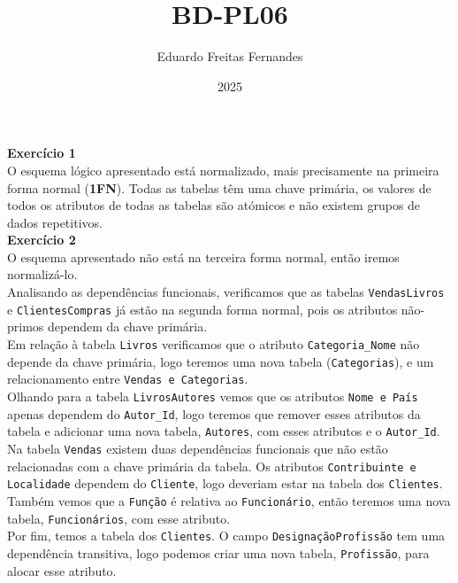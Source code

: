 \documentclass[a4paper,11pt]{article}
\title{BD-PL06}
\author{Eduardo Freitas Fernandes}
\date{2025}
\begin{document}
\maketitle

\noindent \textbf{Exercício 1}\\

\noindent O esquema lógico apresentado está normalizado, mais precisamente na primeira forma normal (\textbf{1FN}). Todas as tabelas têm uma chave primária, os valores de todos os atributos de todas as tabelas são atómicos e não existem grupos de dados repetitivos.\\

\noindent \textbf{Exercício 2}\\

\noindent O esquema apresentado não está na terceira forma normal, então iremos normalizá-lo.\\

\noindent Analisando as dependências funcionais, verificamos que as tabelas \texttt{VendasLivros} e \texttt{ClientesCompras} já estão na segunda forma normal, pois os atributos não-primos dependem da chave primária.\\

\noindent Em relação à tabela \texttt{Livros} verificamos que o atributo \texttt{Categoria\_Nome} não depende da chave primária, logo teremos uma nova tabela (\texttt{Categorias}), e um relacionamento entre \texttt{Vendas e Categorias}.\\

\noindent Olhando para a tabela \texttt{LivrosAutores} vemos que os atributos \texttt{Nome e País} apenas dependem do \texttt{Autor\_Id}, logo teremos que remover esses atributos da tabela e adicionar uma nova tabela, \texttt{Autores}, com esses atributos e o \texttt{Autor\_Id}.\\

\noindent Na tabela \texttt{Vendas} existem duas dependências funcionais que não estão relacionadas com a chave primária da tabela. Os atributos \texttt{Contribuinte e Localidade} dependem do \texttt{Cliente}, logo deveriam estar na tabela dos \texttt{Clientes}. Também vemos que a \texttt{Função} é relativa ao \texttt{Funcionário}, então teremos uma nova tabela, \texttt{Funcionários}, com esse atributo.\\

\noindent Por fim, temos a tabela dos \texttt{Clientes}. O campo \texttt{DesignaçãoProfissão} tem uma dependência transitiva, logo podemos criar uma nova tabela, \texttt{Profissão}, para alocar esse atributo.
\end{document}
